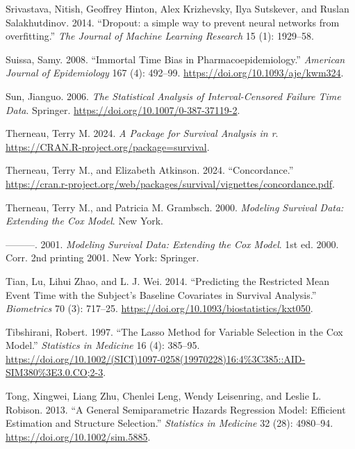 \documentclass[
  letterpaper,
  krantz2]{style/krantz}
\newlength{\cslhangindent}
\newenvironment{CSLReferences}[2] %
 {\begin{list}{}{%
  \setlength{\itemindent}{0pt}
  \setlength{\leftmargin}{0pt}
  \setlength{\parsep}{0pt}
  \ifodd #1
   \setlength{\leftmargin}{\cslhangindent}
   \setlength{\itemindent}{-1\cslhangindent}
  \fi
  \setlength{\itemsep}{#2\baselineskip}}}
 {\end{list}}
\begin{document}
\begin{CSLReferences}{1}{0}
Srivastava, Nitish, Geoffrey Hinton, Alex Krizhevsky, Ilya Sutskever,
and Ruslan Salakhutdinov. 2014. {``{Dropout: a simple way to prevent
neural networks from overfitting}.''} \emph{The Journal of Machine
Learning Research} 15 (1): 1929--58.

Suissa, Samy. 2008. {``Immortal Time Bias in Pharmacoepidemiology.''}
\emph{American Journal of Epidemiology} 167 (4): 492--99.
\url{https://doi.org/10.1093/aje/kwm324}.

Sun, Jianguo. 2006. \emph{The Statistical Analysis of Interval-Censored
Failure Time Data}. Springer.
\url{https://doi.org/10.1007/0-387-37119-2}.

Therneau, Terry M. 2024. \emph{A Package for Survival Analysis in r}.
\url{https://CRAN.R-project.org/package=survival}.

Therneau, Terry M., and Elizabeth Atkinson. 2024. {``{Concordance}.''}
\url{https://cran.r-project.org/web/packages/survival/vignettes/concordance.pdf}.

Therneau, Terry M., and Patricia M. Grambsch. 2000. \emph{{Modeling
Survival Data: Extending the Cox Model}}. New York.

---------. 2001. \emph{{Modeling Survival Data: Extending the Cox
Model}}. 1st ed. 2000. Corr. 2nd printing 2001. New York: Springer.

Tian, Lu, Lihui Zhao, and L. J. Wei. 2014. {``Predicting the Restricted
Mean Event Time with the Subject's Baseline Covariates in Survival
Analysis.''} \emph{Biometrics} 70 (3): 717--25.
\url{https://doi.org/10.1093/biostatistics/kxt050}.

Tibshirani, Robert. 1997. {``The Lasso Method for Variable Selection in
the Cox Model.''} \emph{Statistics in Medicine} 16 (4): 385--95.
\url{https://doi.org/10.1002/(SICI)1097-0258(19970228)16:4\%3C385::AID-SIM380\%3E3.0.CO;2-3}.

Tong, Xingwei, Liang Zhu, Chenlei Leng, Wendy Leisenring, and Leslie L.
Robison. 2013. {``A General Semiparametric Hazards Regression Model:
Efficient Estimation and Structure Selection.''} \emph{Statistics in
Medicine} 32 (28): 4980--94. \url{https://doi.org/10.1002/sim.5885}.


\end{CSLReferences}
\end{document}
